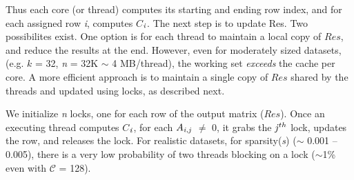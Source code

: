 
     Thus each core (or thread) 
     computes its starting and ending row
     index, and for each assigned row {\it{i}}, computes
     $C$$_{{\it{i}}}$. The next step is to update Res.
     Two possibilites exist. One option is for each thread
     to maintain a local copy of $Res$, and reduce the results at the
     end.
     However, even for moderately sized datasets, (e.g. $k$ = 32,
     {\it{n}} = 32K %
    $\sim$  
    4 MB/thread), the working set 
     {\it{exceeds}} the cache per core.
     A more efficient approach is to maintain a
     single copy of $Res$ shared by the threads and updated using
     locks, as described next.

     We initialize {\it{n}} locks, one for each row of the output
     matrix ($Res$).
     Once an executing thread computes $C$$_{{\it{i}}}$,
     for each  $A_{{\it{i}},{\it{j}}}$ $\neq$ 0, it grabs the
     ${\it{j}}^{th}$ lock, updates the row, and releases the lock. 
     For realistic datasets, for sparsity({\it{s}})
     ($\sim$
     0.001 -- 0.005), there is a very low probability of two threads
     blocking on a lock ($\sim$1\% even with ${\mathcal{C}}$ =
     128). 


